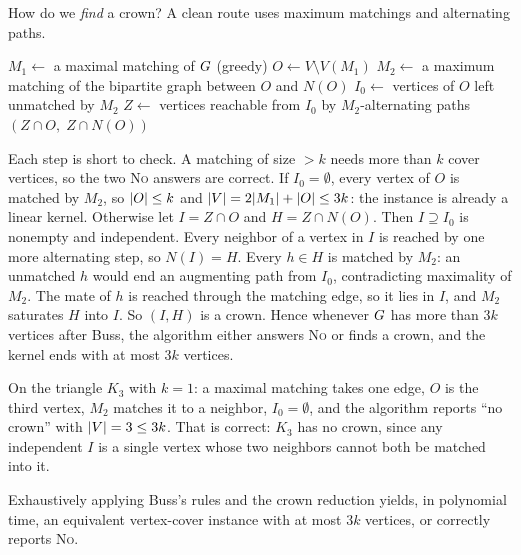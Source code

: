 How do we \emph{find} a crown? A clean route uses maximum matchings and alternating paths.

\begin{algorithm}[H]
\caption{\textsc{FindCrown}$(\Gph)$ --- crown via two matchings}
\label{ch25:alg-crown}
\DontPrintSemicolon
{}
$M_1 \gets$ a maximal matching of $G$ (greedy)\;
$O \gets V\setminus V(M_1)$
$M_2 \gets$ a maximum matching of the bipartite graph between $O$ and $N(O)$\;
$I_0 \gets$ vertices of $O$ left unmatched by $M_2$\;
$Z \gets$ vertices reachable from $I_0$ by $M_2$-alternating paths\;
\Return $(Z\cap O,\; Z\cap N(O))$\;
\end{algorithm}

Each step is short to check. A matching of size $>k$ needs more than $k$ cover
vertices, so the two \textsc{No} answers are correct. If $I_0=\emptyset$, every
vertex of $O$ is matched by $M_2$, so $\lvert O\rvert\le k$ and
$\lvert V\rvert=2\lvert M_1\rvert+\lvert O\rvert\le 3k$: the instance is already a linear kernel. Otherwise
let $I=Z\cap O$ and $H=Z\cap N(O)$. Then $I\supseteq I_0$ is nonempty and
independent. Every neighbor of a vertex in $I$ is reached by one more alternating
step, so $N(I)=H$. Every $h\in H$ is matched by $M_2$: an unmatched $h$ would end an
augmenting path from $I_0$, contradicting maximality of $M_2$. The mate of $h$ is
reached through the matching edge, so it lies in $I$, and $M_2$ saturates $H$ into
$I$. So $(I,H)$ is a crown. Hence whenever $G$ has more than $3k$ vertices after
Buss, the algorithm either answers \textsc{No} or finds a crown, and the kernel
ends with at most $3k$ vertices.

On the triangle $K_3$ with $k=1$: a maximal matching takes one edge, $O$ is the
third vertex, $M_2$ matches it to a neighbor, $I_0=\emptyset$, and the algorithm
reports ``no crown'' with $\lvert V\rvert=3\le 3k$. That is correct: $K_3$ has no crown,
since any independent $I$ is a single vertex whose two neighbors cannot both be
matched into it.

\begin{theorem}\label{ch25:thm-crown-kernel}
Exhaustively applying Buss's rules and the crown reduction yields, in polynomial time, an equivalent vertex-cover instance with at most $3k$ vertices, or correctly reports \textsc{No}.
\end{theorem}

